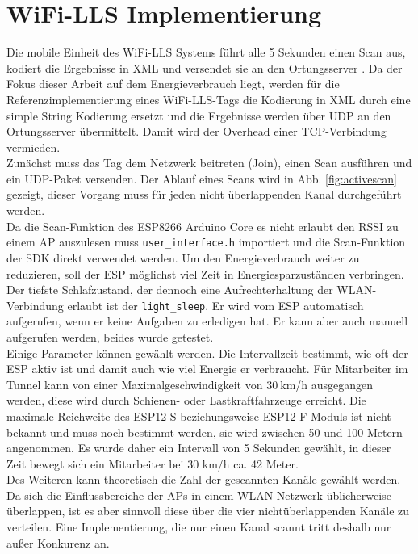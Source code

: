 \section{WiFi-LLS Implementierung}
\label{ch:phase1:sec:wifills}
Die mobile Einheit des WiFi-LLS Systems führt alle 5 Sekunden einen Scan aus, kodiert die Ergebnisse in XML und versendet sie an den Ortungsserver \cite{chen2007design}.
Da der Fokus dieser Arbeit auf dem Energieverbrauch liegt, werden für die Referenzimplementierung eines WiFi-LLS-Tags die Kodierung in XML durch eine simple String Kodierung ersetzt und die Ergebnisse werden über UDP an den Ortungsserver übermittelt. 
Damit wird der Overhead einer TCP-Verbindung vermieden.\\
Zunächst muss das Tag dem Netzwerk beitreten (Join), einen Scan ausführen und ein UDP-Paket versenden.
Der Ablauf eines Scans wird in Abb. \ref{fig:activescan} gezeigt, dieser Vorgang muss für jeden nicht überlappenden Kanal durchgeführt werden.\\
Da die Scan-Funktion des ESP8266 Arduino Core es nicht erlaubt den RSSI zu einem AP auszulesen muss \texttt{user\_interface.h} importiert und die Scan-Funktion der SDK direkt verwendet werden.
Um den Energieverbrauch weiter zu reduzieren, soll der ESP möglichst viel Zeit in Energiesparzuständen verbringen.
Der tiefste Schlafzustand, der dennoch eine Aufrechterhaltung der WLAN-Verbindung erlaubt ist der \texttt{light\_sleep}. 
Er wird vom ESP automatisch aufgerufen, wenn er keine Aufgaben zu erledigen hat.
Er kann aber auch manuell aufgerufen werden, beides wurde getestet.\\
Einige Parameter können gewählt werden. 
Die Intervallzeit bestimmt, wie oft der ESP aktiv ist und damit auch wie viel Energie er verbraucht.
Für Mitarbeiter im Tunnel kann von einer Maximalgeschwindigkeit von $30\ $km/h ausgegangen werden, diese wird durch Schienen- oder Lastkraftfahrzeuge erreicht. 
Die maximale Reichweite des ESP12-S beziehungsweise ESP12-F Moduls ist nicht bekannt und muss noch bestimmt werden, sie wird zwischen 50 und 100 Metern angenommen.
Es wurde daher ein Intervall von 5 Sekunden gewählt, in dieser Zeit bewegt sich ein Mitarbeiter bei 30 km/h ca. 42 Meter.\\
Des Weiteren kann theoretisch die Zahl der gescannten Kanäle gewählt werden. 
Da sich die Einflussbereiche der APs in einem WLAN-Netzwerk üblicherweise überlappen, ist es aber sinnvoll diese über die vier nichtüberlappenden Kanäle zu verteilen. 
Eine Implementierung, die nur einen Kanal scannt tritt deshalb nur außer Konkurenz an.\\
